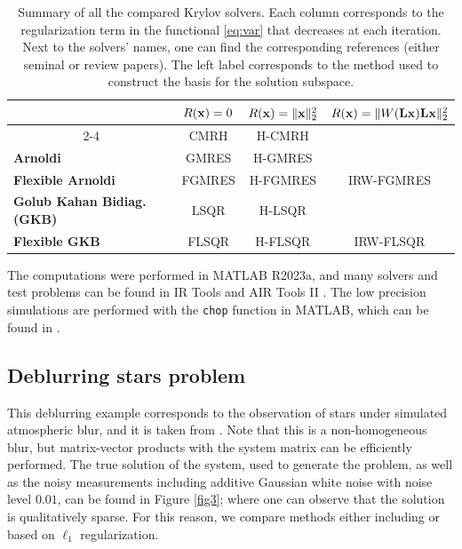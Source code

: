 \documentclass[11pt]{article}
\numberwithin{equation}{section}
\newcommand{\bfL}{{\bf L}}
\newcommand{\bfx}{{\bf x}}
\begin{document}
\begingroup
\renewcommand{\arraystretch}{1} %
\setlength{\tabcolsep}{4pt} %
\small
\begin{table}[h]
\caption{Summary of all the compared Krylov solvers. Each column corresponds to the regularization term in the functional \eqref{eq:var} that decreases at each iteration. Next to the solvers' names, one can find the corresponding references (either seminal or review papers). The left label corresponds to the method used to construct the basis for the solution subspace.}
\label{tab:methods2}
\begin{tabular}{cccc}
& \bf $R(\bfx) =0$ & \bf $R(\bfx)=\|\bfx\|_2^2$  &  $R(\bfx)=\|W(\bfL\bfx)\bfL\bfx\|_2^2$   \\ \cline{2-4} 
\multicolumn{1}{l|}{\bf Hessenberg } & CMRH \cite{sadok1999new} & H-CMRH \cite{brown2024hcmrh} &  \\
\multicolumn{1}{l|}{\bf{Arnoldi}} & GMRES \cite{Saad1886gmres} & H-GMRES \cite{Chung2024survey} &  \\
\multicolumn{1}{l|}{\bf{Flexible Arnoldi}} & FGMRES \cite{Gazzola2014GAT} & H-FGMRES \cite{Chung2024survey} & IRW-FGMRES \cite{Gazzola2021IRW} \\
\multicolumn{1}{l|}{\bf Golub Kahan Bidiag. (GKB)} & LSQR \cite{Saunders1882lsqr}  & H-LSQR \cite{Chung2024survey} & \\
\multicolumn{1}{l|}{\bf Flexible GKB} & FLSQR \cite{Chung2019lp} & H-FLSQR \cite{Chung2019lp} & IRW-FLSQR \cite{Gazzola2021IRW}
\end{tabular}
\end{table}
\normalsize
\endgroup

The computations were performed in MATLAB R2023a, and many solvers and test problems can be found in IR Tools \cite{IRtools} and AIR Tools II \cite{hansen2018air}. The low precision simulations are performed with the {\tt chop} function in MATLAB, which can be found in  \cite{higham2019simulating}.

\subsection{Deblurring stars problem} 
This deblurring example corresponds to the observation of stars under simulated atmospheric blur, and it is taken from \cite{RestoreTools,Nagy1998degraded}. Note that this is a non-homogeneous blur, but matrix-vector products with the system matrix can be efficiently performed. The true solution of the system, used to generate the problem, as well as the noisy measurements including additive Gaussian white noise with noise level $0.01$, can be found in Figure \ref{fig3}; where one can observe that the solution is qualitatively sparse. For this reason, we compare methods either including or based on $\ell_1$ regularization.
\end{document}
